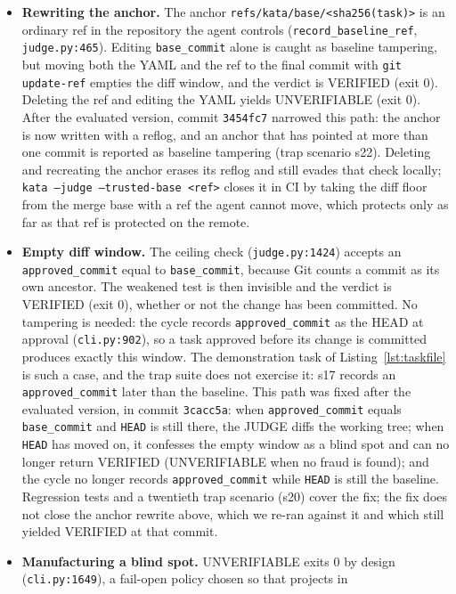 \documentclass[11pt]{article}
\begin{document}
\begin{itemize}
\item \textbf{Rewriting the anchor.} The anchor
\texttt{refs/kata/base/<sha256(task)>} is an ordinary ref in the repository
the agent controls (\texttt{record\_baseline\_ref}, \texttt{judge.py:465}).
Editing \texttt{base\_commit} alone is caught as baseline tampering, but
moving both the YAML and the ref to the final commit with
\texttt{git update-ref} empties the diff window, and the verdict is VERIFIED
(exit 0). Deleting the ref and editing the YAML yields UNVERIFIABLE (exit 0).
After the evaluated version, commit \texttt{3454fc7} narrowed this path: the
anchor is now written with a reflog, and an anchor that has pointed at more
than one commit is reported as baseline tampering (trap scenario s22).
Deleting and recreating the anchor erases its reflog and still evades that
check locally; \texttt{kata --judge --trusted-base <ref>} closes it in CI by
taking the diff floor from the merge base with a ref the agent cannot move,
which protects only as far as that ref is protected on the remote.
\item \textbf{Empty diff window.} The ceiling check (\texttt{judge.py:1424})
accepts an \texttt{approved\_commit} equal to \texttt{base\_commit}, because
Git counts a commit as its own ancestor. The weakened test is then invisible
and the verdict is VERIFIED (exit 0), whether or not the change has been
committed. No tampering is needed: the cycle records \texttt{approved\_commit}
as the HEAD at approval (\texttt{cli.py:902}), so a task approved before its
change is committed produces exactly this window. The demonstration task of
Listing~\ref{lst:taskfile} is such a case, and the trap suite does not
exercise it: s17 records an \texttt{approved\_commit} later than the
baseline. This path was fixed after the evaluated version, in commit
\texttt{3cacc5a}: when \texttt{approved\_commit} equals
\texttt{base\_commit} and \texttt{HEAD} is still there, the JUDGE diffs the
working tree; when \texttt{HEAD} has moved on, it confesses the empty window
as a blind spot and can no longer return VERIFIED (UNVERIFIABLE when no
fraud is found); and the cycle no longer records
\texttt{approved\_commit} while \texttt{HEAD} is still the baseline.
Regression tests and a twentieth trap scenario (s20) cover the fix; the fix
does not close the anchor rewrite above, which we re-ran against it and
which still yielded VERIFIED at that commit.
\item \textbf{Manufacturing a blind spot.} UNVERIFIABLE exits 0 by design
(\texttt{cli.py:1649}), a fail-open policy chosen so that projects in

\end{itemize}
\end{document}
